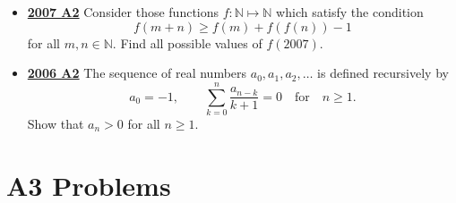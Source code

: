 \documentclass[11pt]{scrartcl}
\begin{document}
\begin{itemize}[leftmargin=*]
 
\item \href{https://artofproblemsolving.com/community/c6h214702p1187155}{\textbf{2007 A2}} Consider those functions $ f: \mathbb{N} \mapsto \mathbb{N}$ which satisfy the condition
\[ f(m + n) \geqslant  f(m) + f(f(n)) - 1
\]
for all $ m,n \in \mathbb{N}.$ Find all possible values of $ f(2007).$
\item \href{https://artofproblemsolving.com/community/c6h145078p821388}{\textbf{2006 A2}} The sequence of real numbers $a_0,a_1,a_2,\dots$ is defined recursively by\[a_0=-1,\qquad\sum_{k=0}^n\dfrac{a_{n-k}}{k+1}=0\quad\text{for}\quad n\geqslant  1.\]Show that $ a_{n} > 0$ for all $ n\geqslant  1$.
\end{itemize}
\newpage
\section*{A3 Problems} \label{A3}  
\end{document}

